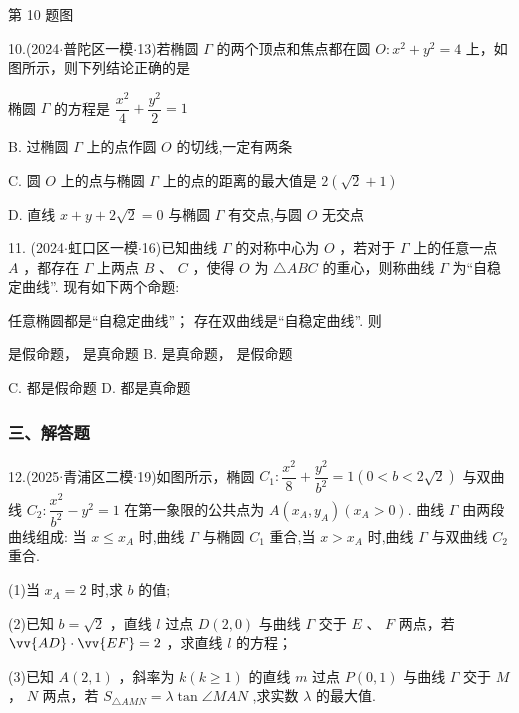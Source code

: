 第 10 题图

10.(2024$\cdot$普陀区一模$\cdot$13)若椭圆 $\Gamma$ 的两个顶点和焦点都在圆 $O : {x}^{2} + {y}^{2} = 4$ 上，如图所示，则下列结论正确的是 \dotfill{(\kh{})}

\xx{}{}{}{}椭圆 $\Gamma$ 的方程是 $\dfrac{{x}^{2}}{4} + \dfrac{{y}^{2}}{2} = 1$

B. 过椭圆 $\Gamma$ 上的点作圆 $O$ 的切线,一定有两条

C. 圆 $O$ 上的点与椭圆 $\Gamma$ 上的点的距离的最大值是 $2\left( {\sqrt{2} + 1}\right)$

D. 直线 $x + y + 2\sqrt{2} = 0$ 与椭圆 $\Gamma$ 有交点,与圆 $O$ 无交点

11. (2024$\cdot$虹口区一模$\cdot$16)已知曲线 $\Gamma$ 的对称中心为 $O$ ，若对于 $\Gamma$ 上的任意一点 $A$ ，都存在 $\Gamma$ 上两点 $B$ 、 $C$ ，使得 $O$ 为 $\bigtriangleup {ABC}$ 的重心，则称曲线 $\Gamma$ 为“自稳定曲线”. 现有如下两个命题:

   任意椭圆都是“自稳定曲线”；  存在双曲线是“自稳定曲线”. 则 \dotfill{(\kh{})}

\xx{}{}{}{}  是假命题，  是真命题 B.   是真命题，  是假命题

C.     都是假命题 D.     都是真命题

\subsubsection*{三、解答题}

12.(2025$\cdot$青浦区二模$\cdot$19)如图所示，椭圆 ${C}_{1} : \dfrac{{x}^{2}}{8} + \dfrac{{y}^{2}}{{b}^{2}} = 1\left( {0 < b < 2\sqrt{2}}\right)$ 与双曲线 ${C}_{2} : \dfrac{{x}^{2}}{{b}^{2}} - {y}^{2} = 1$ 在第一象限的公共点为 $A\left( {{x}_{A},{y}_{A}}\right) \left( {{x}_{A} > 0}\right)$. 曲线 $\Gamma$ 由两段曲线组成: 当 $x \leq  {x}_{A}$ 时,曲线 $\Gamma$ 与椭圆 ${C}_{1}$ 重合,当 $x > {x}_{A}$ 时,曲线 $\Gamma$ 与双曲线 ${C}_{2}$ 重合.

(1)当 ${x}_{A} = 2$ 时,求 $b$ 的值;

(2)已知 $b = \sqrt{2}$ ，直线 $l$ 过点 $D\left( {2,0}\right)$ 与曲线 $\Gamma$ 交于 $E$ 、 $F$ 两点，若 $\vv{AD} \cdot  \vv{EF} = 2$ ，求直线 $l$ 的方程；

(3)已知 $A\left( {2,1}\right)$ ，斜率为 $k\left( {k \geq  1}\right)$ 的直线 $m$ 过点 $P\left( {0,1}\right)$ 与曲线 $\Gamma$ 交于 $M$ ， $N$ 两点，若 ${S}_{\bigtriangleup {AMN}} =  \lambda \tan \angle {MAN}$ ,求实数 $\lambda$ 的最大值.

